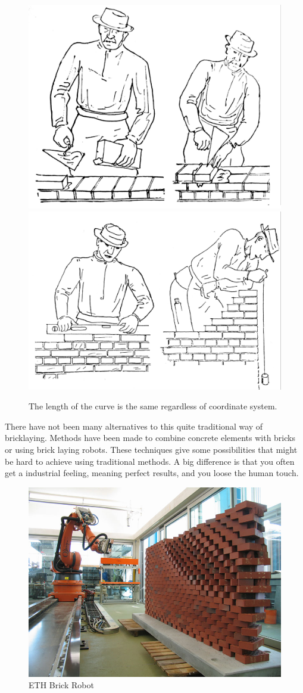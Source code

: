 \begin{figure}[H]
\centering
\includegraphics[width=0.45\linewidth ]{figure/Introduction/bricklayer2.pdf}
\includegraphics[width=0.45\linewidth ]{figure/Introduction/bricklayer1.pdf}
\caption{The length of the curve is the same regardless of coordinate system.\cite{ref:murning}}
\label{fig:murning2}
\end{figure}



There have not been many alternatives to this quite traditional way of bricklaying. Methods have been made to combine concrete elements with bricks or using brick laying robots. These techniques give some possibilities that might be hard to achieve using traditional methods. A big difference is that you often get a industrial feeling, meaning perfect results, and you loose the human touch.

\begin{figure}[H]
\centering
\includegraphics[width=0.8\linewidth ]{figure/Introduction/RobotBrick.jpg}
\caption{ETH Brick Robot}
\end{figure}



